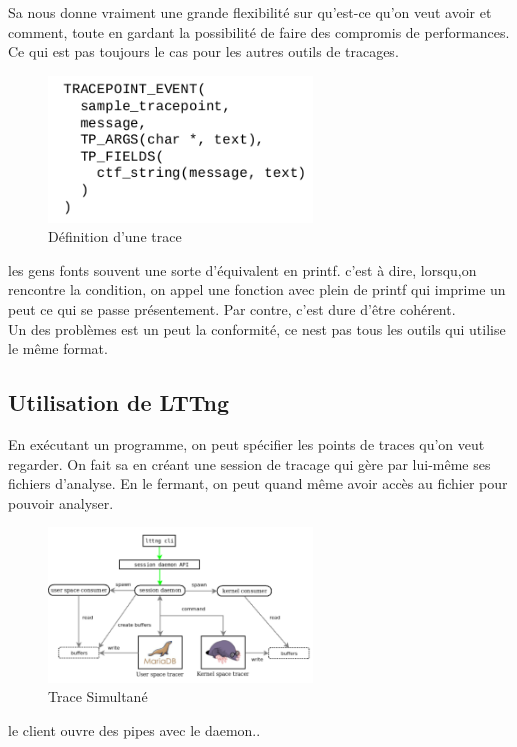 \documentclass[oneside]{book}
\begin{document}
Sa nous donne vraiment une grande flexibilité sur qu'est-ce qu'on veut avoir et comment, toute en gardant la possibilité de faire des compromis de performances. Ce qui est pas toujours le cas pour les autres outils de tracages.\\

\begin{figure}[!ht]
\centering
\includegraphics[width = 7cm]{definition_trace.png}
\caption{Définition d'une trace}
\end{figure}
les gens fonts souvent une sorte d'équivalent en printf. c'est à dire, lorsqu,on rencontre la condition, on appel une fonction avec plein de printf qui imprime un peut ce qui se passe présentement. Par contre, c'est dure d'être cohérent.\\

Un des problèmes est un peut la conformité, ce nest pas tous les outils qui utilise le même format.

\subsection{Utilisation de LTTng}
En exécutant un programme, on peut spécifier les points de traces qu'on veut regarder. On fait sa en créant une session de tracage qui gère par lui-même ses fichiers d'analyse. En le fermant, on peut quand même avoir accès au fichier pour pouvoir analyser. \\

\begin{figure}[!ht]
\centering
\includegraphics[width = 7cm]{trace_simultane.png}
\caption{Trace Simultané}
\end{figure}
le client ouvre des pipes avec le daemon..\\
\end{document}
